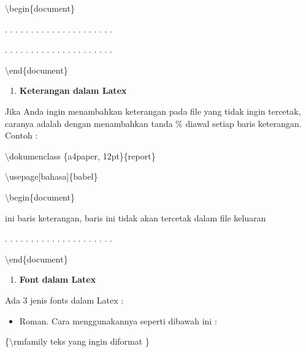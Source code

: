 $\setminus$begin\{document\}\par \vspace{12pt}

. . . . . . . . . . . . . . . . . . . . .

. . . . . . . . . . . . . . . . . . . . .
\par \vspace{12pt}
$\setminus$end\{document\}

\begin{enumerate}
\setcounter{enumi}{\thenumberedCntB}
\item \textbf{Keterangan dalam Latex}
\setcounter{numberedCntB}{\theenumi}
\end{enumerate}
\hspace{0,5in}Jika Anda ingin menambahkan keterangan pada file yang tidak ingin tercetak, caranya adalah dengan menambahkan tanda \% diawal setiap baris keterangan. Contoh :\par \vspace{12pt}

$\setminus$dokumenclass \{a4paper, 12pt\}\{report\}\par \vspace{12pt}

$\setminus$usepage$[$bahasa$]$\{babel\}\par \vspace{12pt}

$\setminus$begin\{document\}\par \vspace{12pt}

ini baris keterangan, baris ini tidak akan tercetak dalam file 
keluaran

. . . . . . . . . . . . . . . . . . . . .\par \vspace{12pt}

$\setminus$end\{document\}

\begin{enumerate}
\setcounter{enumi}{\thenumberedCntB}
\item \textbf{Font dalam Latex}
\setcounter{numberedCntB}{\theenumi}
\end{enumerate}
Ada 3 jenis fonts dalam Latex :

\begin{itemize}
\item Roman. Cara menggunakannya seperti dibawah ini :
\end{itemize}
\hspace{0,5in}\{$\setminus$rmfamily teks yang ingin diformat \}

